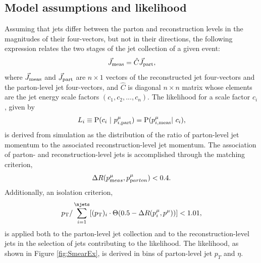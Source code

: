 \subsection{Model assumptions and likelihood} 
Assuming that jets differ between the parton and reconstruction levels in the magnitudes of their four-vectors, but not in their directions, the following expression relates the two stages of the jet collection of a given event:
\begin{equation}
\vec{J}_{\rm meas} = \hat{C} \vec{J}_{\rm part},
\end{equation}
where $\vec{J}_{\rm meas}$ and $\vec{J}_{\rm part}$ are $n\times 1$ vectors of the reconstructed jet four-vectors and the parton-level jet four-vectors, and $\hat{C}$ is diagonal $n\times n$ matrix whose elements are the jet energy scale factors $(c_1,c_2,...,c_n)$. The likelihood for a scale factor $c_i$, given by
\begin{equation}
L_{i}\equiv{\rm P}(c_i\ |\ p^{\mu}_{i,\rm part})={\rm P}(p^{\mu}_{i,\rm meas}|\ c_{i}),
\label{eq:JetEnergyLikelihood}
\end{equation}
is derived from simulation as the distribution of the ratio of parton-level jet momentum to the associated reconstruction-level jet momentum. The association of parton- and reconstruction-level jets is accomplished through the matching criterion,
\begin{equation}
\Delta R(p^{\mu}_{\textrm meas},p^{\mu}_{\textrm parton})<0.4.
\end{equation}	
Additionally, an isolation criterion,
\begin{equation}
p_{\rm T}/\sum_{i=1}^{\njets}[(p_{\rm T})_{i}\cdot\Theta(0.5-\Delta R(p^{\mu}_{i},p^{\mu}))]<1.01,
\end{equation}
is applied both to the parton-level jet collection and to the reconstruction-level jets in the selection of jets contributing to the likelihood. The likelihood, as shown in Figure \ref{fig:SmearEx}, is derived in bins of parton-level jet $p_T$ and $\eta$.
